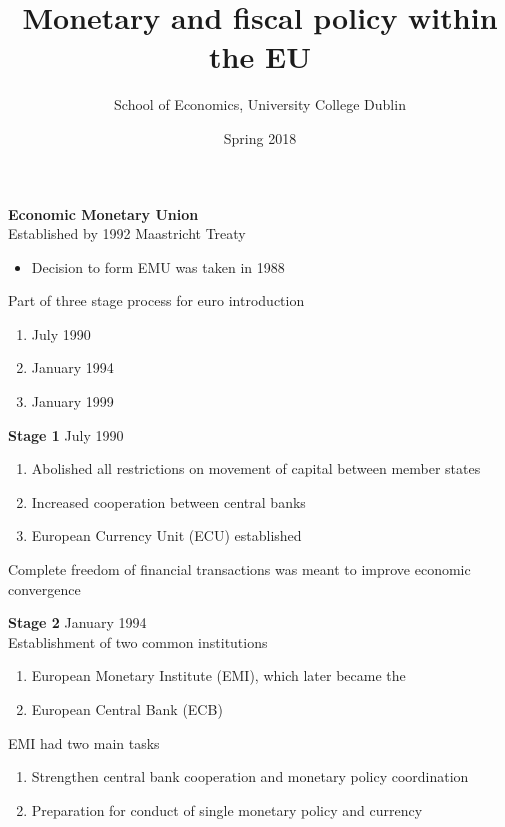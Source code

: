 \documentclass{beamer}
\title{Monetary and fiscal policy within the EU}
\author{School of Economics, University College Dublin}
\date{Spring 2018}
\begin{document}
\begin{frame}
 \titlepage
\end{frame}

\begin{frame}
  \textbf{Economic Monetary Union}\\
  Established by 1992 Maastricht Treaty
  \begin{itemize}
    \item Decision to form EMU was taken in 1988
  \end{itemize}
  \medskip
  Part of three stage process for euro introduction  
  \begin{enumerate}
    \item July 1990
    \item January 1994
    \item January 1999
  \end{enumerate}
\end{frame}

\begin{frame}
  \textbf{Stage 1} July 1990\\  
  \begin{enumerate}
    \item Abolished all restrictions on movement of capital between member states
    \item Increased cooperation between central banks
    \item European Currency Unit (ECU) established
  \end{enumerate}
  \medskip
  Complete freedom of financial transactions was meant to improve economic convergence
\end{frame}

\begin{frame}
  \textbf{Stage 2} January 1994\\
  Establishment of two common institutions
  \begin{enumerate}
    \item European Monetary Institute (EMI), which later became the
    \item European Central Bank (ECB)
  \end{enumerate}
  \medskip
  EMI had two main tasks
  \begin{enumerate}
    \item Strengthen central bank cooperation and monetary policy coordination
    \item Preparation for conduct of single monetary policy and currency
  \end{enumerate}
\end{frame}
\end{document}
